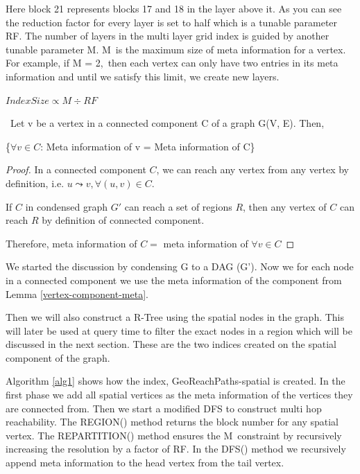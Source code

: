 {{Here block 21 represents blocks 17 and 18 in the layer above it. As you can see the reduction factor for every layer is set to half which is a tunable parameter }{RF}{. The number of layers in the multi layer grid index is guided by another tunable parameter }{M}{. }{M}{~is the maximum size of meta information for a vertex. For example, if }{M = 2,}{~then each vertex can only have two entries in its meta information and until we satisfy this limit, we create new layers.}

\begin{center}
$Index Size \propto M \div RF$
\end{center}
\vspace{2mm}

\begin{lemma}
\label{vertex-component-meta}
{~Let v be a vertex in a connected component C of a graph G(V, E). Then,}

{\{$\forall v \in C$: Meta information of v = Meta information of C\}}\newline
\end{lemma}

\begin{proof}
In a connected component $C$, we can reach any vertex from any vertex by definition, i.e. $u \leadsto v, \forall (u, v) \in C$. 

If $C$ in condensed graph $G'$ can reach a set of regions $R$, then any vertex of $C$ can reach $R$ by definition of connected component.

Therefore, meta information of $C =$ meta information of $\forall v \in C$
\end{proof}

{We started the discussion by condensing G to a DAG (G'). Now we for
each node in a connected component we use the meta information of the
component from Lemma \ref{vertex-component-meta}.}

Then we will also construct a R-Tree using the spatial nodes in the graph. This will later be used at query time to filter the exact nodes in a region which will be discussed in the next section. These are the two indices created on the spatial component of the graph.

{Algorithm \ref{alg1} shows how the index, GeoReachPaths-spatial is created. In the first phase we add all spatial vertices as the meta information of the vertices they are connected from. Then we start a modified DFS to construct multi hop reachability. The REGION() method returns the block number for any spatial vertex. The REPARTITION() method ensures the }{M}{~constraint by recursively increasing the resolution by a factor of }{RF}{. In the DFS() method we recursively append meta information to the head vertex from the tail vertex.}

}
